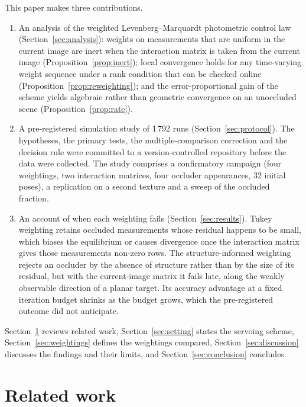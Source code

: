 \documentclass[preprint,12pt]{elsarticle}
\theoremstyle{remark}
\begin{document}
This paper makes three contributions.
\begin{enumerate}
\item An analysis of the weighted Levenberg--Marquardt photometric control
  law (Section~\ref{sec:analysis}): weights on measurements that are uniform in
  the current image are inert when the interaction matrix is taken from the
  current image (Proposition~\ref{prop:inert}); local convergence holds for
  any time-varying weight sequence under a rank condition that can be checked
  online (Proposition~\ref{prop:reweighting}); and the error-proportional gain
  of the scheme yields algebraic rather than geometric convergence on an
  unoccluded scene (Proposition~\ref{prop:rate}).
\item A pre-registered simulation study of 1\,792 runs
  (Section~\ref{sec:protocol}). The hypotheses, the primary tests, the
  multiple-comparison correction and the decision rule were committed to a
  version-controlled repository before the data were collected. The study
  comprises a confirmatory campaign (four weightings, two interaction
  matrices, four occluder appearances, 32 initial poses), a replication on a
  second texture and a sweep of the occluded fraction.
\item An account of when each weighting fails (Section~\ref{sec:results}).
  Tukey weighting retains occluded measurements whose residual happens to be
  small, which biases the equilibrium or causes divergence once the
  interaction matrix gives those measurements non-zero rows. The
  structure-informed weighting rejects an occluder by the absence of
  structure rather than by the size of its residual, but with the
  current-image matrix it fails late, along the weakly observable direction of
  a planar target. Its accuracy advantage at a fixed iteration budget shrinks as
  the budget grows, which the pre-registered outcome did not anticipate.
\end{enumerate}
Section~\ref{sec:related} reviews related work, Section~\ref{sec:setting}
states the servoing scheme, Section~\ref{sec:weightings} defines the
weightings compared, Section~\ref{sec:discussion} discusses the findings and
their limits, and Section~\ref{sec:conclusion} concludes.

\section{Related work}
\label{sec:related}
\end{document}

